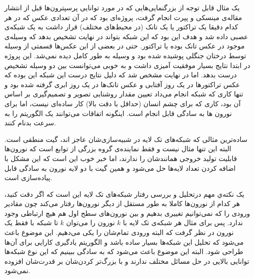 \documentclass[11pt,a4paper,twocolumn]{article}
\begin{document}
یک مثال قابل توجه از بزرگنمایی‌هایی که در مورد توانایی پرسپترون‌ها قبل از انتشار مقاله‌ی مینسکی و پپرت انجام گرفت، پروژه‌ای بود که در آن تعدادی عکس که در هر کدام دقیقا یک تراکتور یا یک تانک (در محیط‌های مختلف) قرار داشت به یک شبکه‌ی عصبی داده شد و هدف این بود که این شبکه بتواند در نهایت تشخیص بدهد که وسیله‌ی موجود در عکس تانک بوده یا تراکتور. حتی در بعضی از این عکس‌ها قسمتی از وسیله توسط درختان جنگلی پوشیده شده بود و وسیله به طور کامل دیده نمی‌شد. این پروژه در ابتدا نتایج بسیار موفقیت آمیزی داشت و به خوبی می‌توانست بین دو وسیله تشخیص درست بدهد. اما در نهایت مشخص شد که دلیل نتایج درست این شبکه این بوده که عکس تراکتورها در یک روز آفتابی و عکس تانک‌ها در یک روز ابری گرفته شده بود و تنها کاری که شبکه انجام می‌داد تعیین مقدار روشنایی تصویر و تصمیم‌گیری بر اساس آن بود، کاری که برای چشم انسان (حداقل با دقت بالا) کار ساده‌ای نیست، اما برای نورون ها به سادگی قابل انجام است. اینگونه اتفاقات می‌توانند یک الگوریتم را به سرعت بدنام کنند.	\cite{ml-hinton}

ساده‌ترین مثالی که شبکه‌های تک لایه در شبیه‌سازی‌شان عاجز اند، گیت منطقی 
 است. البته این تنها مثال نیست و فقط نماینده‌ی گروه بزرگی از توابع است که نورون‌ها قابلیت تولید خروجی همانند‌شان را ندارند، اما خبر خوب این است که این مشکل با اضافه کردن تعداد لایه‌ها حل می‌شود و همین گیت 
 با دو لایه نورون به سادگی قابل پیاده‌سازی است.
 
یک نکته‌ي مهم درتحلیل و بررسی رفتار شبکه‌های تک لایه این است که اگر دقت کنید، هر کدام از نورون‌ها کاملا به طور مستقل از دیگر نورون‌ها رفتار می‌کند چون مقادیر ورودی را که نمی‌توانیم تغییری بدهیم و بین نورون‌های سطح اول هم هیچ ارتباطی وجود ندارد. پس برای مثال هر شبکه‌ی تک لایه با $k$ نورون را می‌توان $k$ تا شبکه با فقط یک نورون در نظر گرفت که البته ورودی تمام‌شان را یکی می‌دهیم. این موضوع باعث می‌شود که تحلیل این شبکه‌ها بسیار ساده باشد و الگوریتم یادگیری کارایی برای آن‌ها طراحی شود. البته این موضوع باعث می‌‌شود که به سادگی ببینیم که این نوع شبکه‌ها توانایی بالایی در حل مسائل مختلف ندارند و با بزرگ‌تر کردن‌شان بر قدرت‌شان افزوده نمی‌شود.
\end{document}
